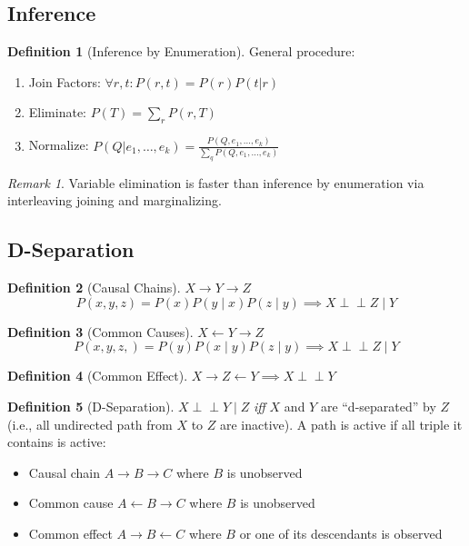 \documentclass[11pt]{article}
\theoremstyle{definition}
\newtheorem{definition}{Definition}[section]
\theoremstyle{remark}
\newtheorem*{remark}{Remark}
\newcommand{\indep}{\perp \!\!\! \perp}
\begin{document}
\subsection{Inference}
\begin{definition}[Inference by Enumeration]
General procedure:
\begin{enumerate}
\item Join Factors: $\forall r,t: P(r,t)=P(r)P(t|r)$
\item Eliminate: $P(T)=\sum_r P(r,T)$
\item Normalize: $P(Q|e_1,\dots,e_k)=\frac{P(Q,e_1,\dots,e_k)}{\sum_q P(Q,e_1,\dots,e_k)}$
\end{enumerate}
\end{definition}

\begin{remark}
Variable elimination is faster than inference by enumeration via interleaving joining and marginalizing.
\end{remark}

\subsection{D-Separation}
\begin{definition}[Causal Chains] $X \to Y \to Z$ 
$$P(x,y,z) = P(x)P(y \mid x)P(z \mid y)\implies X\indep Z \mid Y$$
\end{definition}

\begin{definition}[Common Causes] $X \leftarrow Y \to Z$
\[   P(x,y,z,) = P(y)P(x \mid y) P(z \mid y) \implies X\indep Z \mid Y       \]
\end{definition}

\begin{definition}[Common Effect] $X\to Z \leftarrow Y \implies X \indep Y$
\end{definition}
\begin{definition}[D-Separation]
$X \indep Y \mid Z$ \textit{iff} $X$ and $Y$ are ``d-separated'' by $Z$ (i.e., all undirected path from $X$ to $Z$ are inactive). A path is active if all triple it contains is active:
\begin{itemize}
\item Causal chain $A\to B\to C$ where $B$ is unobserved
\item Common cause $A\leftarrow B \to C$ where $B$ is unobserved
\item Common effect $A \to B \leftarrow C$ where $B$ or one of its descendants is observed
\end{itemize}
\end{definition}
\end{document}
